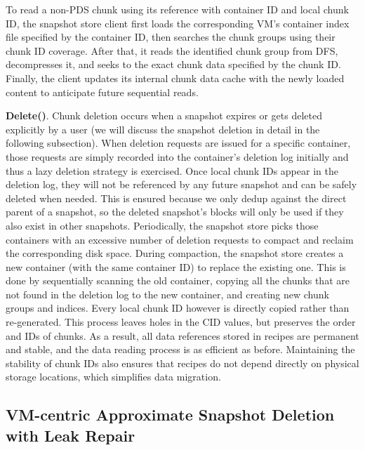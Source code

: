 To read a non-PDS chunk using its reference with container ID and local chunk ID,  the snapshot store client first loads the
corresponding VM's container index file specified by the container ID, then searches the chunk
groups  using their  chunk ID coverage.
After that, it reads the identified chunk group from DFS, decompresses it, and seeks to the exact chunk data 
specified by the chunk ID. 
Finally, the client updates its internal chunk data cache with the newly loaded content to 
anticipate future sequential reads.

\noindent\textbf{Delete()}.
Chunk deletion occurs when a snapshot expires or gets deleted explicitly by a user
(we will discuss the snapshot deletion in detail in the following subsection).
When deletion requests are issued for a specific container,
those requests are simply recorded into the  container's deletion log initially and thus  a lazy
deletion strategy is exercised.
Once local chunk IDs appear in
the deletion log, they will not be referenced by any future snapshot and can be safely deleted when needed. 
This is ensured because we only dedup against the direct parent of a snapshot, so the deleted snapshot's blocks
will only be used if they also exist in other snapshots.
Periodically, the snapshot  store picks those containers with an excessive
number of deletion requests to  compact and  reclaim the corresponding disk space. 
During compaction, the snapshot store creates a new container (with the same container ID) to replace the 
existing one. This is done by sequentially scanning the old container, copying all the chunks that are not 
found in the deletion log to the new container, and creating new chunk groups and indices. 
Every local chunk ID however is directly copied rather than re-generated. This
process leaves holes in the CID values, but preserves the order and IDs of chunks.
As a result, all data references stored 
in recipes are permanent and stable, and the data reading process
is as efficient as before. Maintaining the stability of chunk IDs also ensures that recipes do not
depend directly on physical storage locations, which simplifies data migration.


\subsection{ VM-centric Approximate Snapshot Deletion with Leak Repair}
\label{sect:delete}


